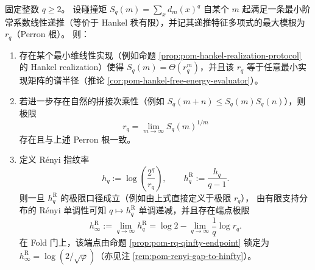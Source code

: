 \begin{proposition}\label{prop:pom-collision-renyi-perron-closure}
固定整数 \(q\ge 2\)。
设碰撞矩 \(S_q(m)=\sum_x d_m(x)^q\) 自某个 \(m\) 起满足一条最小阶常系数线性递推（等价于 Hankel 秩有限），并记其递推特征多项式的最大模根为 \(r_q\)（Perron 根）。
则：
\begin{enumerate}
  \item 存在某个最小维线性实现（例如命题 \ref{prop:pom-hankel-realization-protocol} 的 Hankel realization）使得
  \(
  S_q(m)=\Theta(r_q^m)
  \)，并且该 \(r_q\) 等于任意最小实现矩阵的谱半径（推论 \ref{cor:pom-hankel-free-energy-evaluator}）。
  \item 若进一步存在自然的拼接次乘性（例如 \(S_q(m+n)\le S_q(m)S_q(n)\)），则极限
  \[
  \boxed{\ r_q=\lim_{m\to\infty}S_q(m)^{1/m}\ }
  \]
  存在且与上述 Perron 根一致。
  \item 定义 Rényi 指纹率
  \[
  h_q:=\log\!\left(\frac{2^q}{r_q}\right),
  \qquad
  h_q^{\mathrm R}:=\frac{h_q}{q-1}.
  \]
  则一旦 \(h_q^{\mathrm R}\) 的极限口径成立（例如由上式直接定义于极限 \(r_q\)），
  由有限支持分布的 Rényi 单调性可知 \(q\mapsto h_q^{\mathrm R}\) 单调递减，并且存在端点极限
  \[
  h_\infty^{\mathrm R}:=\lim_{q\to\infty}h_q^{\mathrm R}
  =\log 2-\lim_{q\to\infty}\frac{1}{q}\log r_q.
  \]
  在 Fold 门上，该端点由命题 \ref{prop:pom-rq-qinfty-endpoint} 锁定为 \(h_\infty^{\mathrm R}=\log(2/\sqrt{\varphi})\)（亦见注 \ref{rem:pom-renyi-gap-to-hinfty}）。
\end{enumerate}
\end{proposition}

